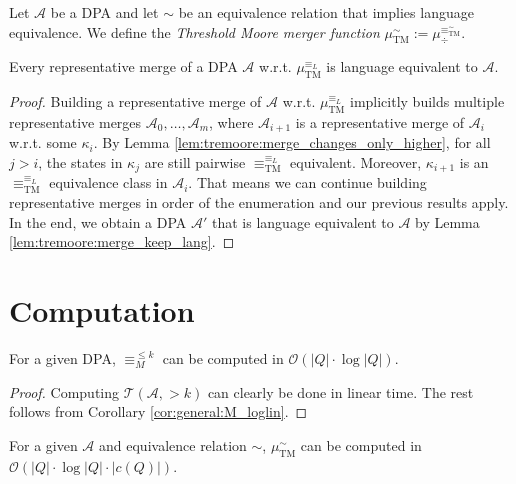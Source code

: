 \vspace{10pt}

\begin{defn}
	Let $\mathcal{A}$ be a DPA and let $\sim$ be an equivalence relation that implies language equivalence. We define the \emph{Threshold Moore merger function} $\mu_\text{TM}^\sim := \mu_\div^{\equiv^\sim_\text{TM}}$.
\end{defn}

\begin{theorem}
	Every representative merge of a DPA $\mathcal{A}$ w.r.t. $\mu_\text{TM}^{\equiv_L}$ is language equivalent to $\mathcal{A}$.
\end{theorem}

\begin{proof}
	Building a representative merge of $\mathcal{A}$ w.r.t. $\mu_\text{TM}^{\equiv_L}$ implicitly builds multiple representative merges $\mathcal{A}_0, \dots, \mathcal{A}_m$, where $\mathcal{A}_{i+1}$ is a representative merge of $\mathcal{A}_i$ w.r.t. some $\kappa_i$. By Lemma \ref{lem:tremoore:merge_changes_only_higher}, for all $j > i$, the states in $\kappa_j$ are still pairwise $\equiv^{\equiv_L}_\text{TM}$ equivalent. Moreover, $\kappa_{i+1}$ is an $\equiv^{\equiv_L}_\text{TM}$ equivalence class in $\mathcal{A}_i$. That means we can continue building representative merges in order of the enumeration and our previous results apply. In the end, we obtain a DPA $\mathcal{A}'$ that is language equivalent to $\mathcal{A}$ by Lemma \ref{lem:tremoore:merge_keep_lang}.
\end{proof}

\section{Computation}
\begin{lem}
	For a given DPA, $\equiv_M^{\leq k}$ can be computed in $\mathcal{O}(|Q| \cdot \log |Q|)$.
	\label{lem:tremoore:kmoore_loglin}
\end{lem}

\begin{proof}
	Computing $\mathcal{T}(\mathcal{A}, >k)$ can clearly be done in linear time. The rest follows from Corollary \ref{cor:general:M_loglin}.
\end{proof}

\begin{lem}
	For a given $\mathcal{A}$ and equivalence relation $\sim$, $\mu_\text{TM}^\sim$ can be computed in $\mathcal{O}(|Q| \cdot \log |Q| \cdot |c(Q)|)$.
\end{lem}

